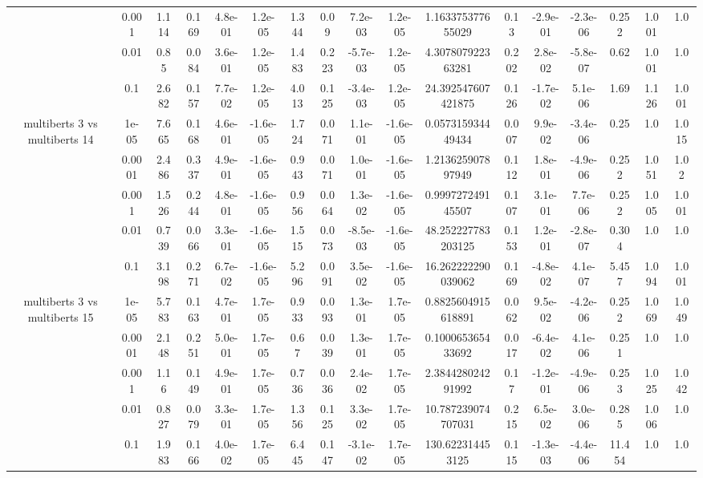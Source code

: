 \begin{tabular}{|c|c|c|c|c|c|c|c|c|c|c|c|c|c|c|c|c|}
 & 0.001 & 1.114 & 0.169 & 4.8e-01 & 1.2e-05 & 1.344 & 0.09 & 7.2e-03 & 1.2e-05 & 1.163375377655029 & 0.13 & -2.9e-01 & -2.3e-06 & 0.252 & 1.001 & 1.0 \\
 & 0.01 & 0.85 & 0.084 & 3.6e-01 & 1.2e-05 & 1.483 & 0.223 & -5.7e-03 & 1.2e-05 & 4.307807922363281 & 0.202 & 2.8e-02 & -5.8e-07 & 0.62 & 1.001 & 1.0 \\
 & 0.1 & 2.682 & 0.157 & 7.7e-02 & 1.2e-05 & 4.013 & 0.125 & -3.4e-03 & 1.2e-05 & 24.392547607421875 & 0.126 & -1.7e-02 & 5.1e-06 & 1.69 & 1.126 & 1.001 \\
\hline
\multirow{5}{*}{multiberts 3 vs multiberts 14} & 1e-05 & 7.665 & 0.168 & 4.6e-01 & -1.6e-05 & 1.724 & 0.071 & 1.1e-01 & -1.6e-05 & 0.057315934449434 & 0.007 & 9.9e-02 & -3.4e-06 & 0.25 & 1.0 & 1.015 \\
 & 0.0001 & 2.486 & 0.337 & 4.9e-01 & -1.6e-05 & 0.943 & 0.071 & 1.0e-01 & -1.6e-05 & 1.213625907897949 & 0.112 & 1.8e-01 & -4.9e-06 & 0.252 & 1.051 & 1.02 \\
 & 0.001 & 1.526 & 0.244 & 4.8e-01 & -1.6e-05 & 0.956 & 0.064 & 1.3e-02 & -1.6e-05 & 0.999727249145507 & 0.107 & 3.1e-01 & 7.7e-06 & 0.252 & 1.005 & 1.001 \\
 & 0.01 & 0.739 & 0.066 & 3.3e-01 & -1.6e-05 & 1.515 & 0.073 & -8.5e-03 & -1.6e-05 & 48.252227783203125 & 0.153 & 1.2e-01 & -2.8e-07 & 0.304 & 1.0 & 1.0 \\
 & 0.1 & 3.198 & 0.271 & 6.7e-02 & -1.6e-05 & 5.296 & 0.091 & 3.5e-02 & -1.6e-05 & 16.262222290039062 & 0.169 & -4.8e-02 & 4.1e-07 & 5.457 & 1.094 & 1.001 \\
\hline
\multirow{5}{*}{multiberts 3 vs multiberts 15} & 1e-05 & 5.783 & 0.163 & 4.7e-01 & 1.7e-05 & 0.933 & 0.093 & 1.3e-01 & 1.7e-05 & 0.8825604915618891 & 0.062 & 9.5e-02 & -4.2e-06 & 0.252 & 1.069 & 1.049 \\
 & 0.0001 & 2.148 & 0.251 & 5.0e-01 & 1.7e-05 & 0.67 & 0.039 & 1.3e-01 & 1.7e-05 & 0.100065365433692 & 0.017 & -6.4e-02 & 4.1e-06 & 0.251 & 1.0 & 1.0 \\
 & 0.001 & 1.16 & 0.149 & 4.9e-01 & 1.7e-05 & 0.736 & 0.036 & 2.4e-02 & 1.7e-05 & 2.384428024291992 & 0.17 & -1.2e-01 & -4.9e-06 & 0.253 & 1.025 & 1.042 \\
 & 0.01 & 0.827 & 0.079 & 3.3e-01 & 1.7e-05 & 1.356 & 0.125 & 3.3e-02 & 1.7e-05 & 10.787239074707031 & 0.215 & 6.5e-02 & 3.0e-06 & 0.285 & 1.006 & 1.0 \\
 & 0.1 & 1.983 & 0.166 & 4.0e-02 & 1.7e-05 & 6.445 & 0.147 & -3.1e-02 & 1.7e-05 & 130.622314453125 & 0.115 & -1.3e-03 & -4.4e-06 & 11.454 & 1.0 & 1.0 \\

\end{tabular}
